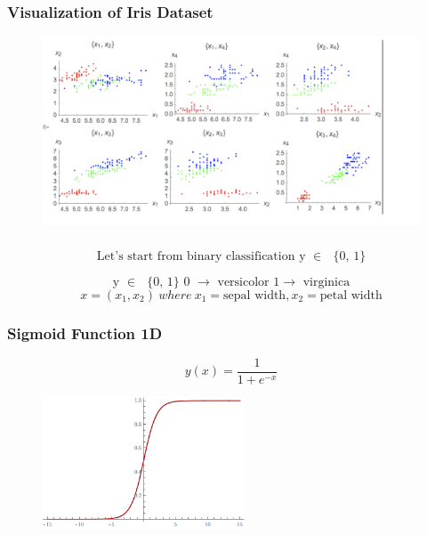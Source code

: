 \documentclass{beamer}
\begin{document}
\begin{frame}
\frametitle{Visualization of Iris Dataset}
\begin{figure}[t]
\includegraphics[scale=0.5]{graphics/feature_vis}
\centering
\end{figure}
\end{frame}

\begin{frame}
\frametitle{}
\[\text{Let's start from binary classification y $\in $ $\{$0, 1$\}$}\]

\[\text{y $\in $ $\{$0, 1$\}$   0 $\to $ versicolor 1$\to $ virginica}\]
\[	
	x = (x_ 1, x_ 2) \
		where \ x_1 = \text{sepal width}, x_2 = \text{petal width}\]
\end{frame}

\begin{frame}
\frametitle{Sigmoid Function 1D}
\[y(x)=\frac{1}{1+e^{-x}}\]
\begin{figure}[t]
\includegraphics[width=6cm]{graphics/1d-sigmoid}
\centering
\end{figure}
\end{frame}
\begin{frame}

\end{frame}
\end{document}
